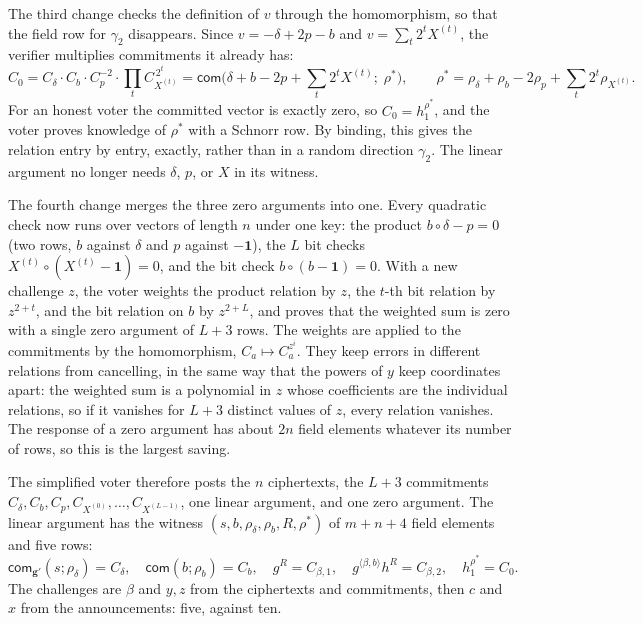 \documentclass[11pt,a4paper]{article}
\newcommand{\com}{\mathsf{com}}
\theoremstyle{remark}
\begin{document}
The third change checks the definition of $v$ through the homomorphism,
so that the field row for $\gamma_2$ disappears. Since $v = -\delta + 2p -
b$ and $v = \sum_t 2^t X^{(t)}$, the verifier multiplies commitments it
already has:
\[
  C_0 = C_\delta \cdot C_b \cdot C_p^{-2} \cdot \prod_t C_{X^{(t)}}^{\,2^t}
      = \com\big(\delta + b - 2p + \textstyle\sum_t 2^t X^{(t)};\; \rho^*\big),
  \qquad \rho^* = \rho_\delta + \rho_b - 2\rho_p + \textstyle\sum_t 2^t \rho_{X^{(t)}} .
\]
For an honest voter the committed vector is exactly zero, so $C_0 =
h_1^{\rho^*}$, and the voter proves knowledge of $\rho^*$ with a Schnorr
row. By binding, this gives the relation entry by entry, exactly, rather
than in a random direction $\gamma_2$. The linear argument no longer
needs $\delta$, $p$, or $X$ in its witness.

The fourth change merges the three zero arguments into one. Every
quadratic check now runs over vectors of length $n$ under one key: the
product $b \circ \delta - p = 0$ (two rows, $b$ against $\delta$ and $p$
against $-\mathbf{1}$), the $L$ bit checks $X^{(t)} \circ (X^{(t)} -
\mathbf{1}) = 0$, and the bit check $b \circ (b - \mathbf{1}) = 0$. With
a new challenge $z$, the voter weights the product relation by $z$, the
$t$-th bit relation by $z^{2+t}$, and the bit relation on $b$ by
$z^{2+L}$, and proves that the weighted sum is zero with a single zero
argument of $L + 3$ rows. The weights are applied to the commitments by
the homomorphism, $C_a \mapsto C_a^{z^i}$. They keep errors in different
relations from cancelling, in the same way that the powers of $y$ keep
coordinates apart: the weighted sum is a polynomial in $z$ whose
coefficients are the individual relations, so if it vanishes for $L + 3$
distinct values of $z$, every relation vanishes. The response of a zero
argument has about $2n$ field elements whatever its number of rows, so
this is the largest saving.

The simplified voter therefore posts the $n$ ciphertexts, the $L + 3$
commitments $C_\delta, C_b, C_p, C_{X^{(0)}}, \ldots, C_{X^{(L-1)}}$, one
linear argument, and one zero argument. The linear argument has the
witness $(s, b, \rho_\delta, \rho_b, R, \rho^*)$ of $m + n + 4$ field
elements and five rows:
\[
  \com_{\mathbf{g}'}(s; \rho_\delta) = C_\delta,\quad
  \com(b; \rho_b) = C_b,\quad
  g^R = C_{\beta,1},\quad
  g^{\langle \beta, b \rangle} h^R = C_{\beta,2},\quad
  h_1^{\rho^*} = C_0 .
\]
The challenges are $\beta$ and $y, z$ from the ciphertexts and
commitments, then $c$ and $x$ from the announcements: five, against ten.
\end{document}
